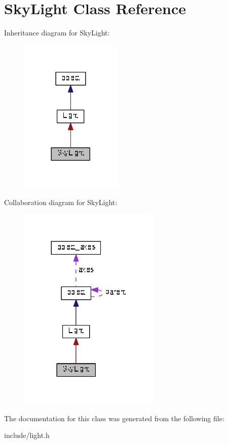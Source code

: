 \hypertarget{classSkyLight}{}\section{Sky\+Light Class Reference}
\label{classSkyLight}


Inheritance diagram for Sky\+Light\+:\nopagebreak
\begin{figure}[H]
\begin{center}
\leavevmode
\includegraphics[width=137pt]{classSkyLight__inherit__graph}
\end{center}
\end{figure}


Collaboration diagram for Sky\+Light\+:\nopagebreak
\begin{figure}[H]
\begin{center}
\leavevmode
\includegraphics[width=191pt]{classSkyLight__coll__graph}
\end{center}
\end{figure}


The documentation for this class was generated from the following file\+:\begin{DoxyCompactItemize}
\item 
include/light.\+h\end{DoxyCompactItemize}
